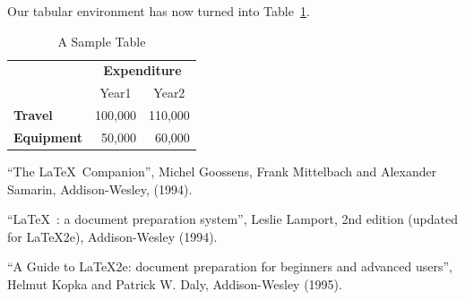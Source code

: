 \documentclass[12pt,captions=tableabove]{scrbook}
\begin{document}
Our tabular environment has now turned into Table~\ref{tab:sample}.

\begin{table}[htbp]
\caption{A Sample Table}
\label{tab:sample}
\centering
\begin{tabular}{lrr}
 & \multicolumn{2}{c}{\bfseries Expenditure}\\
 & \multicolumn{1}{c}{Year1} & \multicolumn{1}{c}{Year2}\\
\bfseries Travel & 100,000 & 110,000\\
\bfseries Equipment & 50,000 & 60,000
\end{tabular}
\end{table}

\begin{thebibliography}{1}
 ``The \LaTeX\ Companion'', Michel Goossens, Frank Mittelbach and
Alexander Samarin, Addison-Wesley, (1994).

 ``\LaTeX\ : a document preparation system'', Leslie Lamport,
2nd edition (updated for \LaTeX2e), Addison-Wesley (1994).

 ``A Guide to \LaTeX2e: document preparation for beginners
and advanced users'', Helmut Kopka and Patrick W. Daly, Addison-Wesley (1995).

\end{thebibliography}
\end{document}
